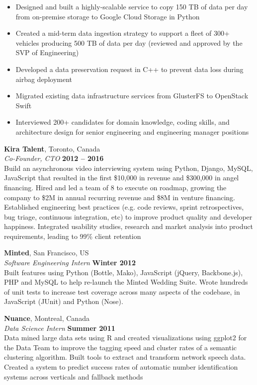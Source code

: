 \documentclass[margin,line]{resume}
\begin{document}
\begin{resume}
    \begin{itemize}
    \item Designed and built a highly-scalable service to copy 150 TB of data per day from on-premise storage to Google Cloud Storage in Python
    \item Created a mid-term data ingestion strategy to support a fleet of 300+ vehicles producing 500 TB of data per day (reviewed and approved by the SVP of Engineering)
    \item Developed a data preservation request in C++ to prevent data loss during airbag deployment
    \item Migrated existing data infrastructure services from GlusterFS to OpenStack Swift
    \item Interviewed 200+ candidates for domain knowledge, coding skills, and architecture design for senior engineering and engineering manager positions
    \end{itemize}
    \vspace{-4mm}
    \textbf{Kira Talent}, Toronto, Canada \vspace{1mm}\\\vspace{1mm}%
    \textsl{Co-Founder, CTO} \hfill \textbf{2012 -- 2016}\\
    Build an asynchronous video interviewing system using Python, Django, MySQL, JavaScript that resulted in the first \$10,000 in revenue and \$300,000 in angel financing. Hired and led a team of 8 to execute on roadmap, growing the company to \$2M in annual recurring revenue and \$8M in venture financing. Established engineering best practices (e.g. code reviews, sprint retrospectives, bug triage, continuous integration, etc) to improve product quality and developer happiness. Integrated usability studies, research and market analysis into product requirements, leading to 99\% client retention

    \textbf{Minted}, San Francisco, US \vspace{1mm}\\\vspace{1mm}%
    \textsl{Software Engineering Intern} \hfill \textbf{Winter 2012}\\
     Built features using Python (Bottle, Mako), JavaScript (jQuery, Backbone.js), PHP and MySQL to help re-launch the Minted Wedding Suite. Wrote hundreds of unit tests to increase test coverage across many aspects of the codebase, in JavaScript (JUnit) and Python (Nose).
     
    \textbf{Nuance}, Montreal, Canada \vspace{1mm}\\\vspace{1mm}%
    \textsl{Data Science Intern} \hfill \textbf{Summer 2011}\\
    Data mined large data sets using R and created visualizations using ggplot2 for the Data Team to improve the tagging speed and cluster rates of a semantic clustering algorithm. Built tools to extract and transform network speech data. Created a system to predict success rates of automatic number identification systems across verticals and fallback methods


\end{resume}
\end{document}
